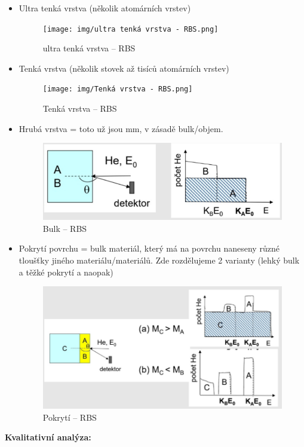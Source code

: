 \begin{itemize}
    \item Ultra tenká vrstva (několik atomárních vrstev)
    \begin{figure}[H]
        \centering
        \texttt{[image: img/ultra tenká vrstva - RBS.png]}
        \caption{ultra tenká vrstva -- RBS}
    \end{figure}

    \item Tenká vrstva (několik stovek až tisíců atomárních vrstev)

    \begin{figure}[H]
        \centering
        \texttt{[image: img/Tenká vrstva - RBS.png]}
        \caption{Tenká vrstva -- RBS}
    \end{figure}

    \item Hrubá vrstva = toto už jsou mm, v zásadě bulk/objem.

    \begin{figure}[H]
        \centering
        \includegraphics[width=0.5\linewidth]{img/Bulk - RBS.png}
        \caption{Bulk -- RBS}
    \end{figure}

    \item Pokrytí povrchu = bulk materiál, který má na povrchu naneseny různé tloušťky jiného materiálu/materiálů. Zde rozdělujeme 2 varianty (lehký bulk a těžké pokrytí a naopak)

    \begin{figure}[H]
        \centering
        \includegraphics[width=0.5\linewidth]{img/pokrytí - RBS.png}
        \caption{Pokrytí -- RBS}
    \end{figure}
\end{itemize}

\textbf{Kvalitativní analýza:}

